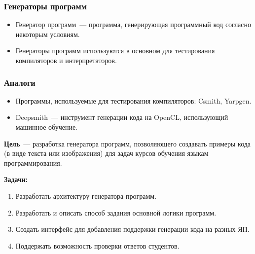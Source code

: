 \documentclass[14pt,aspectratio=169,hyperref={pdftex,unicode},xcolor=dvipsnames]{beamer}
\begin{document}
\begin{frame}
    \frametitle{Генераторы программ}
    \begin{itemize}
        \item Генератор программ~--- программа, генерирующая программный код согласно некоторым условиям.
        \item Генераторы программ используются в основном для тестирования
              компиляторов и интерпретаторов.
    \end{itemize}
\end{frame}

\begin{frame}
    \frametitle{Аналоги}
    \begin{itemize}
        \item Программы, используемые для тестирования компиляторов: Csmith, Yarpgen.
        \item Deepsmith~--- инструмент генерации кода на OpenCL, использующий машинное обучение.
    \end{itemize}
\end{frame}

\begin{frame}
    \textbf{Цель}~--- разработка генератора программ, позволяющего создавать примеры кода
    (в виде текста или изображения) для
    задач курсов обучения языкам программирования.

    \textbf{Задачи:}
    \begin{enumerate}
        \item Разработать архитектуру генератора программ.
        \item Разработать и описать способ задания основной логики программ.
        \item Создать интерфейс для добавления поддержки генерации кода на разных ЯП.
        \item Поддержать возможность проверки ответов студентов.
    \end{enumerate}
\end{frame}


\end{document}
